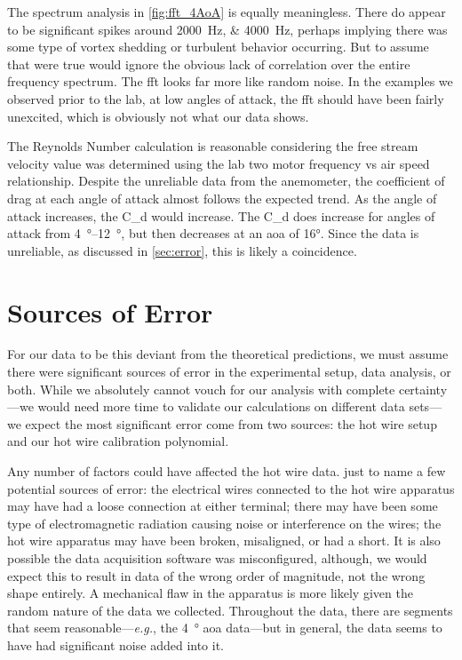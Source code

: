 The spectrum analysis in \autoref{fig:fft_4AoA} is equally meaningless. There do appear to be significant spikes around \qtylist{2000;4000}{\hertz}, perhaps implying there was some type of vortex shedding or turbulent behavior occurring. But to assume that were true would ignore the obvious lack of correlation over the entire frequency spectrum. The \acrfull{fft} looks far more like random noise. In the examples we observed prior to the lab, at low angles of attack, the \acrshort{fft} should have been fairly unexcited, which is obviously not what our data shows.

The Reynolds Number calculation is reasonable considering the free stream velocity value was determined using the lab two motor frequency vs air speed relationship. Despite the unreliable data from the anemometer, the coefficient of drag at each angle of attack almost follows the expected trend. As the angle of attack increases, the \gls{C_d} would increase. The \gls{C_d} does increase for angles of attack from \qtyrange{4}{12}{\unit{\degree}}, but then decreases at an \acrshort{aoa} of \num{16}\unit{\degree}. Since the data is unreliable, as discussed in \autoref{sec:error}, this is likely a coincidence.

\section{Sources of Error} \label{sec:error}

For our data to be this deviant from the theoretical predictions, we must assume there were significant sources of error in the experimental setup, data analysis, or both. While we absolutely cannot vouch for our analysis with complete certainty—we would need more time to validate our calculations on different data sets—we expect the most significant error come from two sources: the hot wire setup and our hot wire calibration polynomial.

Any number of factors could have affected the hot wire data. just to name a few potential sources of error: the electrical wires connected to the hot wire apparatus may have had a loose connection at either terminal; there may have been some type of electromagnetic radiation causing noise or interference on the wires; the hot wire apparatus may have been broken, misaligned, or had a short. It is also possible the data acquisition software was misconfigured, although, we would expect this to result in data of the wrong order of magnitude, not the wrong shape entirely. A mechanical flaw in the apparatus is more likely given the random nature of the data we collected. Throughout the data, there are segments that seem reasonable—\textit{e.g.}, the \qty{4}{\degree} \acrshort{aoa} data—but in general, the data seems to have had significant noise added into it.

